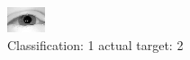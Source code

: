 \begin{figure}[h!]
\begin{center}
\includegraphics[width=0.60\columnwidth]{figures/ID2319_class_1_target_2.png}
\end{center}
\caption{ Classification: 1 actual target: 2}
\label{fig:ID2319_class_1_target_2}
\end{figure}
